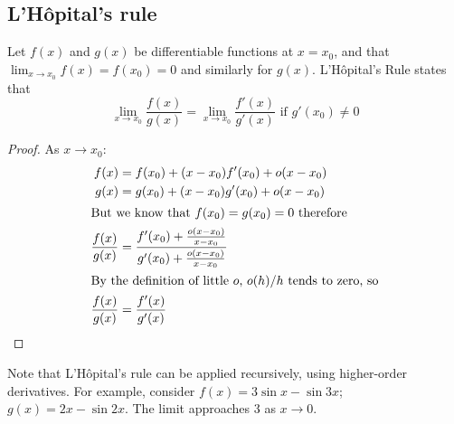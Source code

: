 \subsection{L'H\^opital's rule}
Let \(f(x)\) and \(g(x)\) be differentiable functions at \(x=x_0\), and that \(\lim_{x\to x_0} f(x) = f(x_0) = 0\) and similarly for \(g(x)\).
L'H\^opital's Rule states that
\[
	\lim_{x\to x_0} \frac{f(x)}{g(x)} = \lim_{x\to x_0} \frac{f'(x)}{g'(x)} \text{ if } g'(x_0) \neq 0
\]
\begin{proof}
	As \(x \to x_0\):
	\begin{align*}
		f(x)              & = f(x_0) + (x-x_0) f'(x_0) + o(x-x_0)                                       \\
		g(x)              & = g(x_0) + (x-x_0) g'(x_0) + o(x-x_0)                                       \\
		\intertext{But we know that \(f(x_0)=g(x_0)=0\) therefore}
		\frac{f(x)}{g(x)} & = \frac{f'(x_0) + \frac{o(x-x_0)}{x-x_0}}{g'(x_0) + \frac{o(x-x_0)}{x-x_0}} \\
		\intertext{By the definition of little \(o\), \(o(h)/h\) tends to zero, so}
		\frac{f(x)}{g(x)} & = \frac{f'(x)}{g'(x)}
	\end{align*}
\end{proof}
Note that L'H\^opital's rule can be applied recursively, using higher-order derivatives.
For example, consider \(f(x) = 3\sin x - \sin 3x\); \(g(x) = 2x - \sin 2x\).
The limit approaches 3 as \(x \to 0\).

